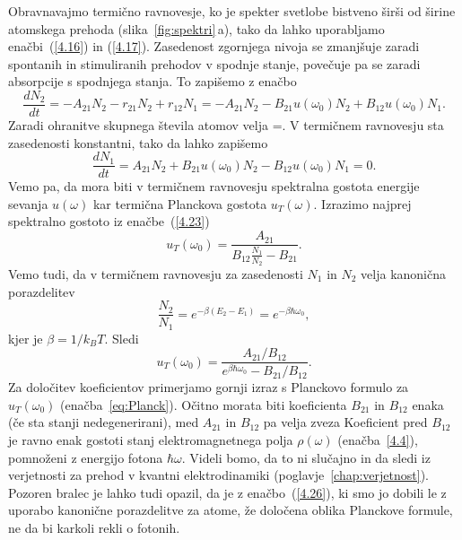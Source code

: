 \noindent
Obravnavajmo termično ravnovesje, ko je spekter svetlobe bistveno širši
od širine atomskega prehoda (slika~\ref{fig:spektri}\,a), tako da lahko
uporabljamo enačbi~(\ref{4.16}) in (\ref{4.17}). Zasedenost zgornjega nivoja
se zmanjšuje zaradi spontanih in stimuliranih prehodov v spodnje
stanje, povečuje pa se zaradi absorpcije s spodnjega stanja. To zapišemo z enačbo
\begin{equation}
\frac{dN_{2}}{dt}=-A_{21}N_2 - r_{21}N_2 + r_{12}N_1 = 
-A_{21}N_{2}-B_{21}u(\omega_{0})N_{2}+B_{12}u(\omega_{0})N_{1}.
\label{4.22}
\end{equation}
Zaradi ohranitve skupnega števila atomov velja 
\beq
{}=.
\eeq
V termičnem ravnovesju sta zasedenosti konstantni, tako da lahko zapišemo 
\begin{equation}
\frac{dN_{1}}{dt}=A_{21}N_{2}+B_{21}u(\omega_{0})N_{2}-B_{12}u(\omega_{0})N_{1}=0.
\label{4.23}
\end{equation}
Vemo pa, da mora biti v termičnem ravnovesju spektralna gostota energije sevanja
$u(\omega)$ kar termična Planckova gostota $u_{T}(\omega)$.
Izrazimo najprej spektralno gostoto iz enačbe~(\ref{4.23})
\begin{equation}
u_{T}(\omega_{0})=\frac{A_{21}}{B_{12}\frac{N_{1}}{N_{2}}-B_{21}}.
\label{4.24}
\end{equation}
Vemo tudi, da v termičnem ravnovesju za zasedenosti $N_{1}$ in $N_{2}$ velja
kanonična porazdelitev
\begin{equation}
\frac{N_{2}}{N_{1}}=e^{-\beta(E_{2}-E_{1})} = e^{-\beta \hbar \omega_0},
\label{4.25}
\end{equation}
kjer je $\beta=1/k_BT$. Sledi
\begin{equation}
u_{T}(\omega_{0})=\frac{A_{21}/B_{12}}{e^{\beta\hbar\omega_{0}}-B_{21}/B_{12}}.
\label{4.26}
\end{equation}
Za določitev koeficientov primerjamo gornji izraz s Planckovo formulo za $u_{T}(\omega_{0})$
(enačba~\ref{eq:Planck}). Očitno morata biti koeficienta $B_{21}$ in $B_{12}$ enaka 
(če sta stanji nedegenerirani), med $A_{21}$ in $B_{12}$ pa velja zveza 
Koeficient pred $B_{12}$ je ravno enak gostoti stanj elektromagnetnega polja 
$\rho(\omega)$ (enačba~\ref{4.4}), pomnoženi z energijo fotona $\hbar\omega$. 
Videli bomo, da to ni slučajno in da sledi iz verjetnosti za prehod v kvantni 
elektrodinamiki (poglavje~\ref{chap:verjetnost}).
Pozoren bralec je lahko tudi opazil, da je z enačbo~(\ref{4.26}),
ki smo jo dobili le z uporabo kanonične porazdelitve za atome, že
določena oblika Planckove formule, ne da bi karkoli rekli o fotonih.

